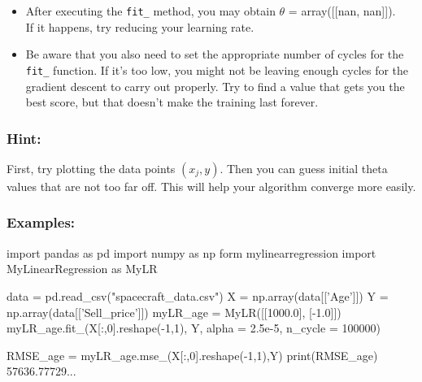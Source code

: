 \documentclass[]{article}
\newenvironment{Shaded}{\begin{snugshade}}{\end{snugshade}}
\newcommand{\BuiltInTok}[1]{\textcolor[rgb]{0.50,0.55,0.55}{#1}}
\newcommand{\DecValTok}[1]{\textcolor[rgb]{0.96,0.45,0.00}{#1}}
\newcommand{\FloatTok}[1]{\textcolor[rgb]{0.96,0.45,0.00}{#1}}
\newcommand{\ImportTok}[1]{\textcolor[rgb]{0.15,0.68,0.38}{#1}}
\newcommand{\NormalTok}[1]{\textcolor[rgb]{0.81,0.81,0.76}{#1}}
\newcommand{\OperatorTok}[1]{\textcolor[rgb]{0.81,0.81,0.76}{#1}}
\newcommand{\StringTok}[1]{\textcolor[rgb]{0.96,0.31,0.31}{#1}}
\begin{document}
\begin{itemize}
\item
  After executing the \texttt{fit\_} method, you may obtain \(\theta\) =
  array({[}{[}nan, nan{]}{]}).\\
  If it happens, try reducing your learning rate.
\item
  Be aware that you also need to set the appropriate number of cycles
  for the \texttt{fit\_} function. If it's too low, you might not be
  leaving enough cycles for the gradient descent to carry out properly.
  Try to find a value that gets you the best score, but that doesn't
  make the training last forever.
\end{itemize}

\hypertarget{hint}{%
\subsubsection{Hint:}\label{hint}}

First, try plotting the data points \((x_{j},y)\). Then you can guess
initial theta values that are not too far off. This will help your
algorithm converge more easily.

\hypertarget{examples-7}{%
\subsubsection{Examples:}\label{examples-7}}

\begin{Shaded}
\begin{Highlighting}[]
\ImportTok{import}\NormalTok{ pandas }\ImportTok{as}\NormalTok{ pd}
\ImportTok{import}\NormalTok{ numpy }\ImportTok{as}\NormalTok{ np}
\NormalTok{form mylinearregression }\ImportTok{import}\NormalTok{ MyLinearRegression }\ImportTok{as}\NormalTok{ MyLR}

\NormalTok{data }\OperatorTok{=}\NormalTok{ pd.read_csv(}\StringTok{"spacecraft_data.csv"}\NormalTok{)}
\NormalTok{X }\OperatorTok{=}\NormalTok{ np.array(data[[}\StringTok{'Age'}\NormalTok{]])}
\NormalTok{Y }\OperatorTok{=}\NormalTok{ np.array(data[[}\StringTok{'Sell_price'}\NormalTok{]])}
\NormalTok{myLR_age }\OperatorTok{=}\NormalTok{ MyLR([[}\FloatTok{1000.0}\NormalTok{], [}\OperatorTok{-}\FloatTok{1.0}\NormalTok{]])}
\NormalTok{myLR_age.fit_(X[:,}\DecValTok{0}\NormalTok{].reshape(}\OperatorTok{-}\DecValTok{1}\NormalTok{,}\DecValTok{1}\NormalTok{), Y, alpha }\OperatorTok{=} \FloatTok{2.5e-5}\NormalTok{, n_cycle }\OperatorTok{=} \DecValTok{100000}\NormalTok{)}

\NormalTok{RMSE_age }\OperatorTok{=}\NormalTok{ myLR_age.mse_(X[:,}\DecValTok{0}\NormalTok{].reshape(}\OperatorTok{-}\DecValTok{1}\NormalTok{,}\DecValTok{1}\NormalTok{),Y)}
 \BuiltInTok{print}\NormalTok{(RMSE_age)}
\DecValTok{57636}\NormalTok{.}\DecValTok{77729}\NormalTok{...}
\end{Highlighting}
\end{Shaded}
\end{document}
